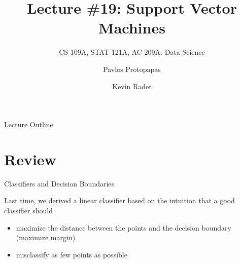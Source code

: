\documentclass[12pt,t]{beamer}
\begin{document}

\title{\large{Lecture \#19: Support Vector Machines}}
\subtitle{CS 109A, STAT 121A, AC 209A: Data Science}
\author{Pavlos Protopapas \and Kevin Rader}
\date{}
{
\frame{
  \titlepage
  
}
}


\begin{frame}{Lecture Outline}
\tableofcontents
\end{frame}



\section{Review}

\begin{frame}{Classifiers and Decision Boundaries} 

Last time, we derived a linear classifier based on the intuition that a good classifier should
\vskip0.2cm
\begin{itemize}
\item maximize the distance between the points and the decision boundary (maximize margin)
\vskip0.2cm
\item misclassify as few points as possible
\end{itemize}
\end{frame}
\end{document}
